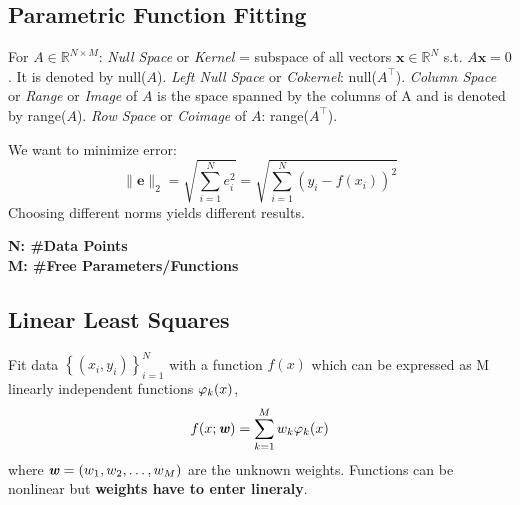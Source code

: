 \subsection{Parametric Function Fitting}
    For $A \in\mathbb{R}^{N \times M}$: \textit{Null Space} or \textit{Kernel} = subspace of all vectors $\mathbf{x}\in\mathbb{R}^N$ s.t. $A\mathbf{x}=0$. It is denoted by null($A$). \textit{Left Null Space} or \textit{Cokernel}: null($A^\top$). \textit{Column Space} or \textit{Range} or \textit{Image} of $A$ is the space spanned by the columns of A and is denoted by range($A$). \textit{Row Space} or \textit{Coimage} of $A$: range($A^\top$).
    
    We want to minimize error:
    \begin{equation*}
        \|\mathbf{e}\|_2=\sqrt{\sum_{i=1}^N e_i^2}=\sqrt{\sum_{i=1}^N (y_i-f(x_i))^2}
    \end{equation*}
    Choosing different norms yields different results.
    
    \textbf{N: \#Data Points \\M: \#Free Parameters/Functions}

\subsection{Linear Least Squares}
    Fit data $\left\{(x_i, y_i)\right\}_{i=1}^{N}$ with a function $f(x)$ which can be expressed as M linearly independent functions $\varphi_k(x)$,
    \begin{equation*}
        f(x;\textbf{\textit{w}}) = \sum_{k=1}^M w_k\varphi_k(x)
    \end{equation*}
    where $\textbf{\textit{w}}=(w_1, w_2, \dots, w_M)$ are the unknown weights.
    Functions can be nonlinear but \textbf{weights have to enter lineraly}.
    
